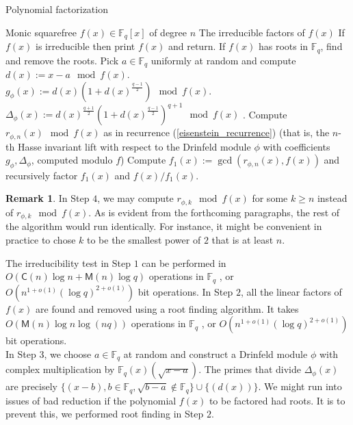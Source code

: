 \documentclass[12pt]{article}
\theoremstyle{plain}
\theoremstyle{definition}
\newtheorem*{remark}{Remark}
\def\F{\ensuremath{\mathbb{F}}}
\def\K{\ensuremath{\mathbb{K}}}
\def\MM{\ensuremath{\mathsf{M}}}
\def\CC{\ensuremath{\mathsf{C}}}
\newcommand{\D}{\Delta}
\begin{document}
\begin{algorithm}[H]
	\caption{Polynomial factorization}
	\label{factoring_algorithm}
	\begin{algorithmic}[1]
		\REQUIRE Monic squarefree $f(x) \in \F_q[x]$ of degree $n$
		\ENSURE The irreducible factors of $f(x)$
		\STATE If $f(x)$ is irreducible then print $f(x)$ and return.
		\STATE If $f(x)$ has roots in $\F_q$, find and remove the roots.
		\STATE Pick $a \in \F_q$ uniformly at random and compute \\ %
		$d(x) := x-a \mod f(x)$. \\
		$g_\phi(x) := d(x)(1+d(x)^{\frac{q-1}{2}}) \mod f(x)$. \\
		$\Delta_\phi(x) := d(x)^{\frac{q+1}{2}}(1+d(x)^{\frac{q-1}{2}})^{q+1} \mod f(x)$ .
		\STATE Compute $r_{\phi,n}(x) \mod f(x)$ as in recurrence (\ref{eisenstein_recurrence}) 
		(that is, the $n$-th Hasse invariant lift with respect to the Drinfeld module $\phi$ with 
		coefficients $g_\phi, \Delta_\phi$, computed modulo $f$)
		\STATE Compute $f_1(x) := \gcd(r_{\phi,n}(x), f(x))$ and recursively factor $f_1(x)$ and $f(x)/f_1(x)$.
	\end{algorithmic}
\end{algorithm}

\begin{remark}
	In Step $4$, we may compute $r_{\phi,k} \mod f(x)$ for some $k\geq n$ instead of $r_{\phi,k} \mod f(x)$. As is evident from the forthcoming paragraphs, the rest of the algorithm would run identically. For instance, it might be convenient in practice to chose $k$ to be the smallest power of $2$ that is at least $n$.
\end{remark}


The irreducibility test in Step $1$ can be performed in $O(\CC(n)\log n + \MM(n)\log q)$ operations 
in $\F_q$ \cite{vzGG}, or $O(n^{1+o(1)} (\log q)^{2+o(1)})$ bit operations. In Step $2$, all the 
linear factors of $f(x)$ are found and removed using a root finding algorithm. It takes 
$O(\MM(n)\log n \log(nq))$ operations in $\F_q$ \cite{vzGG}, or $O(n^{1+o(1)} (\log q)^{2+o(1)})$ 
bit operations. \\

 In Step $3$, we choose $a \in \F_q$ at random and construct a Drinfeld module $\phi$ with complex 
 multiplication by $\F_q(x)(\sqrt{x-a})$. The primes that divide $\D_\phi(x)$ are precisely 
 $\{(x-b),  b \in \F_q, \sqrt{b-a} \notin \F_q\} \cup \{(d(x))\}$. We might run into issues of bad 
 reduction if the polynomial $f(x)$ to be factored had roots. It is to prevent this, we performed 
 root finding in Step $2$. \\
\end{document}
